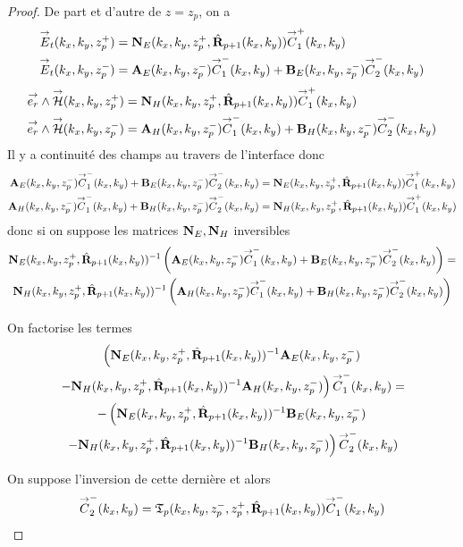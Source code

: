     \begin{proof}
      De part et d'autre de \(z=z_p\), on a 
      \begin{align*}
        {\overset{\rightarrow}{E}}_t(k_x,k_y,z_p^+) &= \mathbf{N}_{E}(k_x,k_y,z_p^+,\hat{\mathbf{R}}_{p+1}(k_x,k_y)){\overset{\rightarrow}{C}}_{1}^+(k_x,k_y)
        \\
        {\overset{\rightarrow}{E}}_t(k_x,k_y,z_p^-) &= \mathbf{A}_E(k_x,k_y,z_p^-){\overset{\rightarrow}{C}}_{1}^-(k_x,k_y) + \mathbf{B}_E(k_x,k_y,z_p^-){\overset{\rightarrow}{C}}_{2}^-(k_x,k_y)
      \end{align*}
      \begin{align*}
        {\overset{\rightarrow}{e_r}}\wedge{\overset{\rightarrow}{\mathcal{H}}}(k_x,k_y,z_p^+) &= \mathbf{N}_{H}(k_x,k_y,z_p^+,\hat{\mathbf{R}}_{p+1}(k_x,k_y)){\overset{\rightarrow}{C}}_{1}^+(k_x,k_y)
        \\
        {\overset{\rightarrow}{e_r}}\wedge{\overset{\rightarrow}{\mathcal{H}}}(k_x,k_y,z_p^-) &= \mathbf{A}_H(k_x,k_y,z_p^-){\overset{\rightarrow}{C}}_{1}^-(k_x,k_y) + \mathbf{B}_H(k_x,k_y,z_p^-){\overset{\rightarrow}{C}}_{2}^-(k_x,k_y)
      \end{align*}
      Il y a continuité des champs au travers de l'interface donc
      \begin{align*}
        \mathbf{A}_E(k_x,k_y,z_p^-){\overset{\rightarrow}{C}}_{1}^-(k_x,k_y) + \mathbf{B}_E(k_x,k_y,z_p^-){\overset{\rightarrow}{C}}_{2}^-(k_x,k_y) &= \mathbf{N}_{E}(k_x,k_y,z_p^+,\hat{\mathbf{R}}_{p+1}(k_x,k_y)){\overset{\rightarrow}{C}}_{1}^+(k_x,k_y)
        \\
        \mathbf{A}_H(k_x,k_y,z_p^-){\overset{\rightarrow}{C}}_{1}^-(k_x,k_y) + \mathbf{B}_H(k_x,k_y,z_p^-){\overset{\rightarrow}{C}}_{2}^-(k_x,k_y) &= \mathbf{N}_{H}(k_x,k_y,z_p^+,\hat{\mathbf{R}}_{p+1}(k_x,k_y)){\overset{\rightarrow}{C}}_{1}^+(k_x,k_y)
      \end{align*}
      donc si on suppose les matrices \(\mathbf{N}_E, \mathbf{N}_H\) inversibles
      \begin{multline*}
        \mathbf{N}_{E}(k_x,k_y,z_p^+,\hat{\mathbf{R}}_{p+1}(k_x,k_y))^{-1}\left(\mathbf{A}_E(k_x,k_y,z_p^-){\overset{\rightarrow}{C}}_{1}^-(k_x,k_y) + \mathbf{B}_E(k_x,k_y,z_p^-){\overset{\rightarrow}{C}}_{2}^-(k_x,k_y)\right) =
        \\
        \mathbf{N}_{H}(k_x,k_y,z_p^+,\hat{\mathbf{R}}_{p+1}(k_x,k_y))^{-1}\left(\mathbf{A}_H(k_x,k_y,z_p^-){\overset{\rightarrow}{C}}_{1}^-(k_x,k_y) + \mathbf{B}_H(k_x,k_y,z_p^-){\overset{\rightarrow}{C}}_{2}^-(k_x,k_y)\right)
      \end{multline*}

      On factorise les termes
      \begin{multline*}
        \left(
        \mathbf{N}_{E}(k_x,k_y,z_p^+,\hat{\mathbf{R}}_{p+1}(k_x,k_y))^{-1}\mathbf{A}_E(k_x,k_y,z_p^-)
        \right.
        \\
        \left.
        - \mathbf{N}_{H}(k_x,k_y,z_p^+,\hat{\mathbf{R}}_{p+1}(k_x,k_y))^{-1}\mathbf{A}_H(k_x,k_y,z_p^-)
        \right){\overset{\rightarrow}{C}}_{1}^-(k_x,k_y) =
        \\
        -\left(
        \mathbf{N}_{E}(k_x,k_y,z_p^+,\hat{\mathbf{R}}_{p+1}(k_x,k_y))^{-1}\mathbf{B}_E(k_x,k_y,z_p^-)
        \right.
        \\
        \left.
        - \mathbf{N}_{H}(k_x,k_y,z_p^+,\hat{\mathbf{R}}_{p+1}(k_x,k_y))^{-1}\mathbf{B}_H(k_x,k_y,z_p^-)
        \right){\overset{\rightarrow}{C}}_{2}^-(k_x,k_y)
      \end{multline*}

      On suppose l'inversion de cette dernière et alors
      \begin{equation*}
        {\overset{\rightarrow}{C}}_{2}^-(k_x,k_y) = \mathfrak{T}_p(k_x,k_y,z_p^-,z_p^+,\hat{\mathbf{R}}_{p+1}(k_x,k_y)) {\overset{\rightarrow}{C}}_{1}^-(k_x,k_y)
      \end{equation*}
    \end{proof}

